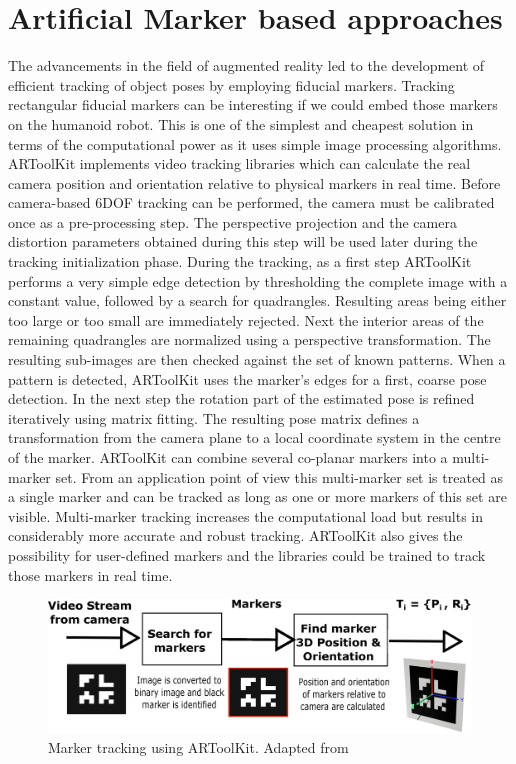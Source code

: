 \section{Artificial Marker based approaches}
	The advancements in the field of augmented reality led to the development of efficient tracking of object poses by employing fiducial markers. Tracking rectangular fiducial markers can be interesting if we could embed those markers on the humanoid robot. This is one of the simplest and cheapest solution in terms of the computational power as it uses simple image processing algorithms. ARToolKit\cite{Kato1999} implements video tracking libraries which can calculate the real camera position and orientation relative to physical markers in real time. Before camera-based 6DOF tracking can be performed, the camera must be calibrated once as a pre-processing step. The perspective projection and the camera distortion parameters obtained during this step will be used later during the tracking initialization phase. During the tracking, as a first step ARToolKit performs a very simple edge detection by thresholding the complete image with a constant value, followed by a search for quadrangles. Resulting areas being either too large or too small are immediately rejected. Next the interior areas of the remaining quadrangles are normalized using a perspective transformation. The resulting sub-images are then checked against the set of known patterns. When a pattern is detected, ARToolKit uses the marker’s edges for a first, coarse pose detection. In the next step the rotation part of the estimated pose is refined iteratively using matrix fitting. The resulting pose matrix defines a transformation from the camera plane to a local coordinate system in the centre of the marker. ARToolKit can combine several co-planar markers into a multi-marker set. From an application point of view this multi-marker set is treated as a single marker and can be tracked as long as one or more markers of this set are visible. Multi-marker tracking increases the computational load but results in considerably more accurate and robust tracking. ARToolKit also gives the possibility for user-defined markers and the libraries could be trained to track those markers in real time.
\begin{figure}[H]
\centering
\includegraphics[width=1\textwidth]{assets/artoolkit.eps}
\caption[Marker tracking using ARToolKit]{Marker tracking using ARToolKit. {Adapted from \cite{Kato1999}}}
\label{fig:artoolkit}
\end{figure}
